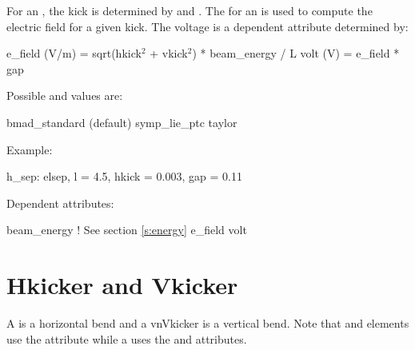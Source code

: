 For an , the kick is determined by  and
. The  for an  is used to compute
the electric field for a given kick. The voltage is a dependent
attribute determined by:
\begin{example}
  e\_field (V/m) = sqrt(hkick$^2$ + vkick$^2$) * beam\_energy / L
  volt (V) = e\_field * gap  
\end{example}


\vskip0.2in \noindent
Possible  and  values are:
\vskip 0.01in
\begin{example}
  bmad\_standard  (default)
  symp\_lie\_ptc
  taylor
\end{example}

\vskip0.2in \noindent
Example:
\begin{example}
  h_sep: elsep, l = 4.5, hkick = 0.003, gap = 0.11
\end{example}

\vskip0.2in \noindent
Dependent attributes:
\begin{example}
  beam\_energy  ! See section \ref{s:energy}
  e_field
  volt
\end{example}

\section{Hkicker and Vkicker}
\label{s:hvkicker}

A  is a horizontal bend and a vn{Vkicker} is a vertical
bend.  Note that  and  elements use the
 attribute while a  uses the  and  
attributes.

\begin{table}[h]
\end{table}

